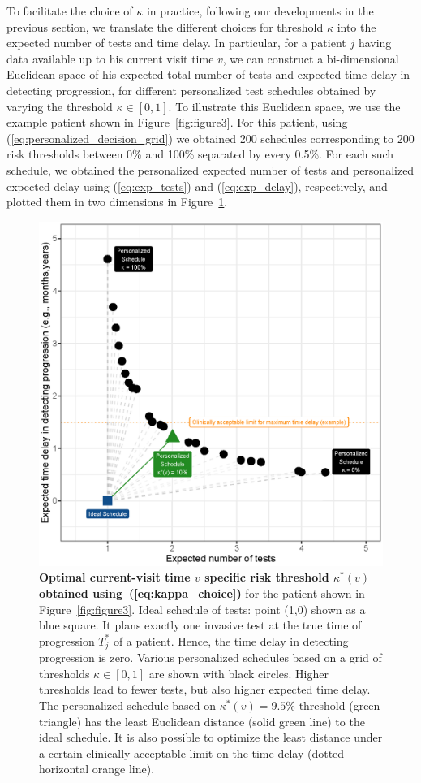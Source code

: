\documentclass[AMA,STIX1COL]{WileyNJD-v2}
\begin{document}
To facilitate the choice of $\kappa$ in practice, following our developments in the previous section, we translate the different choices for threshold $\kappa$ into the expected number of tests and time delay. In particular, for a patient $j$ having data available up to his current visit time $v$, we can construct a bi-dimensional Euclidean space of his expected total number of tests and expected time delay in detecting progression, for different personalized test schedules obtained by varying the threshold $\kappa \in [0, 1]$. To illustrate this Euclidean space, we use the example patient shown in Figure~\ref{fig:figure3}. For this patient, using (\ref{eq:personalized_decision_grid}) we obtained 200 schedules corresponding to 200 risk thresholds between 0\% and 100\% separated by every 0.5\%. For each such schedule, we obtained the personalized expected number of tests and personalized expected delay using (\ref{eq:exp_tests}) and (\ref{eq:exp_delay}), respectively, and plotted them in two dimensions in Figure~\ref{fig:figure4}. 
\begin{figure}[!h]
\centerline{\includegraphics{figure4.eps}}
\caption{\textbf{Optimal current-visit time $v$ specific risk threshold $\kappa^*(v)$ obtained using~(\ref{eq:kappa_choice})} for the patient shown in Figure~\ref{fig:figure3}. Ideal schedule of tests: point (1,0) shown as a blue square. It plans exactly one invasive test at the true time of progression $T^*_j$ of a patient. Hence, the time delay in detecting progression is zero. Various personalized schedules based on a grid of thresholds $\kappa \in [0, 1]$ are shown with black circles. Higher thresholds lead to fewer tests, but also higher expected time delay. The personalized schedule based on $\kappa^*(v)=9.5\%$ threshold (green triangle) has the least Euclidean distance (solid green line) to the ideal schedule. It is also possible to optimize the least distance under a certain clinically acceptable limit on the time delay (dotted horizontal orange line).}
\label{fig:figure4}
\end{figure}
\end{document}
